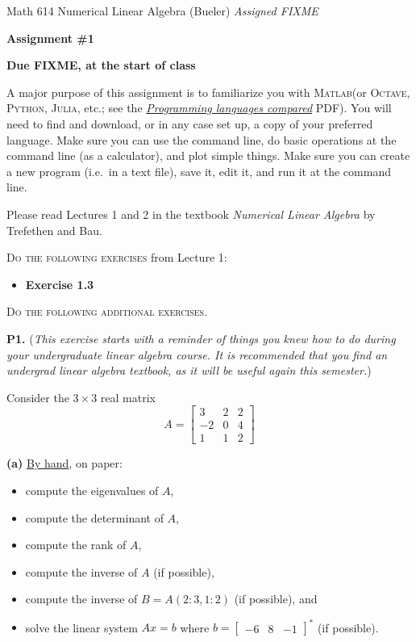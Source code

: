 \documentclass[12pt]{amsart}
\newcommand{\prob}[1]{\bigskip\noindent\textbf{#1.}\quad }
\newcommand{\epart}[1]{\medskip\noindent\textbf{(#1)}\quad }
\newcommand{\Matlab}{\textsc{Matlab}\xspace}
\newcommand{\Octave}{\textsc{Octave}\xspace}
\newcommand{\Python}{\textsc{Python}\xspace}
\newcommand{\Julia}{\textsc{Julia}\xspace}
\begin{document}
\scriptsize \noindent Math 614 Numerical Linear Algebra (Bueler) \hfill \emph{Assigned FIXME}
\normalsize\medskip

\Large\centerline{\textbf{Assignment \#1}}
\large
\medskip

\centerline{\textbf{Due FIXME, at the start of class}}
\medskip
\normalsize

\thispagestyle{empty}

\bigskip

A major purpose of this assignment is to familiarize you with \Matlab (or \Octave, \Python, \Julia, etc.; see the \href{https://bueler.github.io/compareMOP.pdf}{\emph{Programming languages compared}} PDF).  You will need to find and download, or in any case set up, a copy of your preferred language.  Make sure you can use the command line, do basic operations at the command line (as a calculator), and plot simple things.  Make sure you can create a new program (i.e.~in a text file), save it, edit it, and run it at the command line.

\bigskip
\noindent Please read Lectures 1 and 2 in the textbook \emph{Numerical Linear Algebra} by Trefethen and Bau.

\bigskip
\noindent \textsc{Do the following exercises} from Lecture 1:

\begin{itemize}
\item \textbf{Exercise 1.3}
\end{itemize}


\bigskip
\noindent \textsc{Do the following additional exercises.}

\prob{P1}  (\emph{This exercise starts with a reminder of things you knew how to do during your undergraduate linear algebra course.  It is recommended that you find an undergrad linear algebra textbook, as it will be useful again this semester.})

Consider the $3\times 3$ real matrix
    $$A = \begin{bmatrix}   3     &     2    &     2 \\
                            -2    &     0    &     4 \\
                            1     &     1    &     2  \end{bmatrix}$$

\epart{a} \underline{By hand}, on paper:\begin{itemize}
\item compute the eigenvalues of $A$,
\item compute the determinant of $A$,
\item compute the rank of $A$,
\item compute the inverse of $A$ (if possible),
\item compute the inverse of $B=A(2:3,1:2)$ (if possible), and
\item solve the linear system $Ax=b$ where $b = \begin{bmatrix} -6 & 8 & -1 \end{bmatrix}^*$ (if possible).
\end{itemize}
\end{document}
